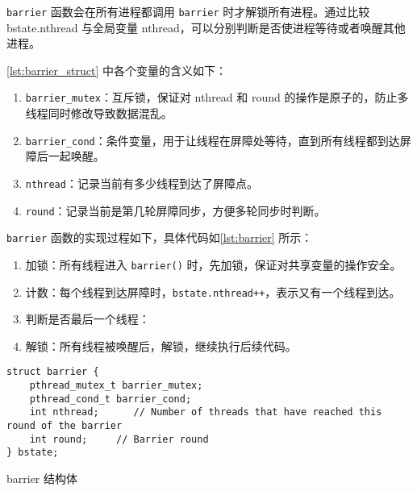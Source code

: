\texttt{barrier} 函数会在所有进程都调用 \texttt{barrier} 时才解锁所有进程。通过比较 bstate.nthread 与全局变量 nthread，可以分别判断是否使进程等待或者唤醒其他进程。

\cref{lst:barrier_struct} 中各个变量的含义如下：

\begin{enumerate}
	\item \texttt{barrier\_mutex}：互斥锁，保证对 nthread 和 round 的操作是原子的，防止多线程同时修改导致数据混乱。
	\item \texttt{barrier\_cond}：条件变量，用于让线程在屏障处等待，直到所有线程都到达屏障后一起唤醒。
	\item \texttt{nthread}：记录当前有多少线程到达了屏障点。
	\item \texttt{round}：记录当前是第几轮屏障同步，方便多轮同步时判断。
\end{enumerate}

\texttt{barrier} 函数的实现过程如下，具体代码如\cref{lst:barrier} 所示：

\begin{enumerate}
	\item 加锁：所有线程进入 \texttt{barrier()} 时，先加锁，保证对共享变量的操作安全。
	\item 计数：每个线程到达屏障时，\texttt{bstate.nthread++}，表示又有一个线程到达。
	\item 判断是否最后一个线程：
	\item 解锁：所有线程被唤醒后，解锁，继续执行后续代码。
\end{enumerate}

\begin{listing}[!htb]
	\begin{verbatim}
struct barrier {
    pthread_mutex_t barrier_mutex;
    pthread_cond_t barrier_cond;
    int nthread;      // Number of threads that have reached this round of the barrier
    int round;     // Barrier round
} bstate;
	\end{verbatim}
	\caption{barrier 结构体}\label{lst:barrier_struct}
\end{listing}

